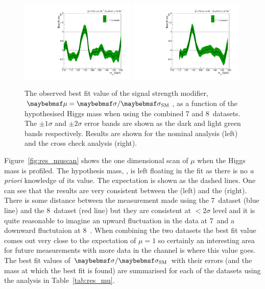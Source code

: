 \begin{figure}
  \includegraphics[width=0.49\textwidth]{results/plots/mva_greenband.pdf}
  \includegraphics[width=0.49\textwidth]{results/plots/sideband_greenband.pdf}
  \caption[The observed best fit value of the signal strength modifier $\mu$]{The observed best fit value of the signal strength modifier, $\mu=\musm$, as a function of the hypothesised Higgs mass \mH when using the combined 7 and 8~\TeV datasets. The $\pm1\sigma$ and $\pm2\sigma$ error bands are shown as the dark and light green bands respectively. Results are shown for the nominal \MFM analysis (left) and the cross check \SMVA analysis (right).}
  \label{fig:res_mumh}
\end{figure}

Figure~\ref{fig:res_muscan} shows the one dimensional \NLL scan of $\mu$ when the Higgs mass \mH is profiled. The hypothesis mass, \mH, is left floating in the fit as there is no \textit{a priori} knowledge of its value. The \SM expectation is shown as the dashed lines. One can see that the results are very consistent between the \MFM (left) and the \SMVA (right). There is some distance between the measurement made using the 7~\TeV dataset (blue line) and the 8~\TeV dataset (red line) but they are consistent at $<2\sigma$ level and it is quite reasonable to imagine an upward fluctuation in the data at 7~\TeV and a downward fluctutaion at 8~\TeV. When combining the two datasets the best fit value comes out very close to the \SM expectation of $\mu=1$ so certainly an interesting area for future measurements with more data in the \Hgg channel is where this value goes. The best fit values of $\musm$ with their errors (and the mass at which the best fit is found) are summarised for each of the datasets using the \MFM analysis in Table~\ref{tab:res_mu}.

